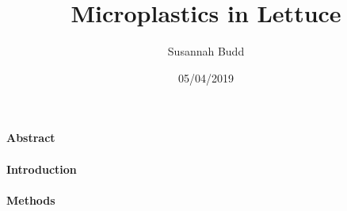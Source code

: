 \documentclass[]{article}
\title{Microplastics in Lettuce}
\author{Susannah Budd}
\date{05/04/2019}
\let\oldparagraph\paragraph
\renewcommand{\paragraph}[1]{\oldparagraph{#1}\mbox{}}
\begin{document}
\maketitle

\hypertarget{abstract}{%
\paragraph{Abstract}\label{abstract}}

\hypertarget{introduction}{%
\paragraph{Introduction}\label{introduction}}

\hypertarget{methods}{%
\paragraph{Methods}\label{methods}}
\end{document}
